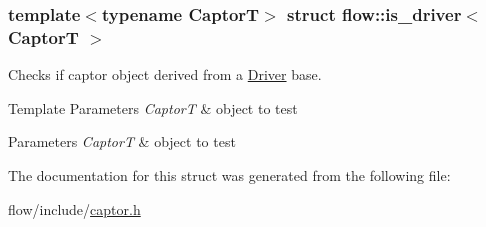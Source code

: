 \subsubsection*{template$<$typename CaptorT$>$\newline
struct flow\+::is\+\_\+driver$<$ Captor\+T $>$}

Checks if captor object derived from a \hyperlink{classflow_1_1_driver}{Driver} base. 


\begin{DoxyTemplParams}{Template Parameters}
{\em CaptorT} & object to test\\
\hline
\end{DoxyTemplParams}

\begin{DoxyParams}{Parameters}
{\em CaptorT} & object to test \\
\hline
\end{DoxyParams}


The documentation for this struct was generated from the following file\+:\begin{DoxyCompactItemize}
\item 
flow/include/\hyperlink{captor_8h}{captor.\+h}\end{DoxyCompactItemize}
